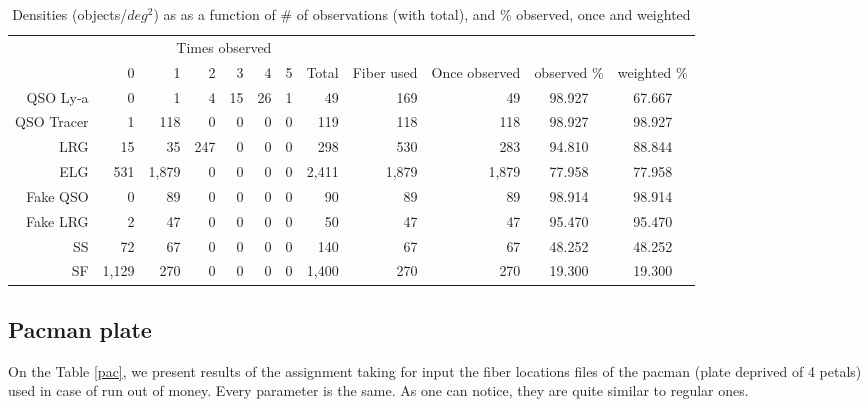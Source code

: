 \documentclass{extarticle}
\def\sqd{$deg^{2}$}
\begin{document}
\begin{table}[H]\begin{center}
\begin{tabular}{rrrrrrrrrrcc}
\hline
\multicolumn{6}{r}{Times observed} \\
	~ &           0 &     1 &  2 & 3 & 4 & 5 &  Total & Fiber used & Once observed & observed $\%$ & weighted $\%$ \\ \hline
   QSO Ly-a   &     0 &     1 &   4 & 15 & 26 & 1 &    49 &   169 &    49 & 98.927 & 67.667\\ 
 QSO Tracer   &     1 &   118 &   0 &  0 &  0 & 0 &   119 &   118 &   118 & 98.927 & 98.927\\ 
        LRG   &    15 &    35 & 247 &  0 &  0 & 0 &   298 &   530 &   283 & 94.810 & 88.844\\ 
        ELG   &   531 & 1,879 &   0 &  0 &  0 & 0 & 2,411 & 1,879 & 1,879 & 77.958 & 77.958\\ 
   Fake QSO   &     0 &    89 &   0 &  0 &  0 & 0 &    90 &    89 &    89 & 98.914 & 98.914\\ 
   Fake LRG   &     2 &    47 &   0 &  0 &  0 & 0 &    50 &    47 &    47 & 95.470 & 95.470\\ 
         SS   &    72 &    67 &   0 &  0 &  0 & 0 &   140 &    67 &    67 & 48.252 & 48.252\\ 
         SF   & 1,129 &   270 &   0 &  0 &  0 & 0 & 1,400 &   270 &   270 & 19.300 & 19.300\\ 
\hline
\end{tabular}
\caption{Densities (objects/\sqd) as as a function of \# of observations (with total), and \% observed, once and weighted}\label{res}
\end{center}\end{table}



\subsection{Pacman plate}
On the Table \ref{pac}, we present results of the assignment taking for input the fiber locations files of the pacman (plate deprived of 4 petals) used in case of run out of money. Every parameter is the same. As one can notice, they are quite similar to regular ones.
\end{document}
